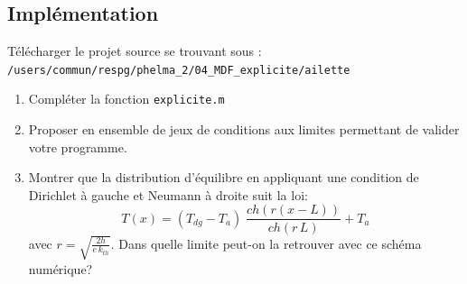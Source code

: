 \documentclass[a4paper, 10pt]{article}
\begin{document}
\subsection{Implémentation}

Télécharger le projet source se trouvant sous :\\
\tt{/users/commun/respg/phelma\_2/04\_MDF\_explicite/ailette} \rm \\

\begin{enumerate}
\item Compléter la fonction \tt{explicite.m} \rm

\item Proposer en ensemble de jeux de conditions aux limites permettant de valider votre programme.


\item Montrer que la distribution d'équilibre en appliquant une condition de Dirichlet à gauche et Neumann à droite suit la loi:
\begin{equation}\label{sch1}
T(x)=\left( {{T_{dg}} - {T_a}} \right)\;\frac{{ch\left( {r\left( {x - L} \right)} \right)}}{{ch\left( {r\,L} \right)}} + {T_a}
\end{equation}
avec 
$r = \sqrt {\frac{{2h}}{{e\,{k_{th}}}}} $. Dans quelle limite peut-on la retrouver avec ce schéma numérique?
\end{enumerate}
\end{document}
